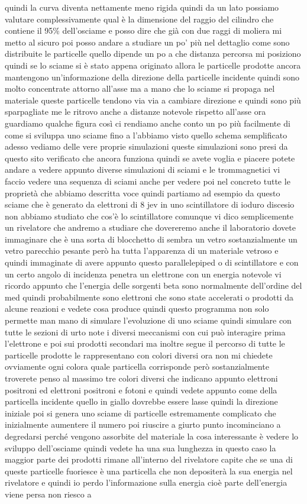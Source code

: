 {quindi la curva diventa nettamente meno rigida quindi da un lato possiamo valutare complessivamente qual è la dimensione del raggio del cilindro che contiene il 95\% dell'osciame e posso dire che già con due raggi di moliera mi metto al sicuro poi posso andare a studiare un po' più nel dettaglio come sono distribuite le particelle quello dipende un po a che distanza percorsa mi posiziono quindi se lo sciame si è stato appena originato allora le particelle prodotte ancora mantengono un'informazione della direzione della particelle incidente quindi sono molto concentrate attorno all'asse ma a mano che lo sciame si propaga nel materiale queste particelle tendono via via a cambiare direzione e quindi sono più sparpagliate me le ritrovo anche a distanze notevole rispetto all'asse ora guardiamo qualche figura così ci rendiamo anche conto un po più facilmente di come si sviluppa uno sciame fino a l'abbiamo visto quello schema semplificato adesso vediamo delle vere proprie simulazioni queste simulazioni sono presi da questo sito verificato che ancora funziona quindi se avete voglia e piacere potete andare a vedere appunto diverse simulazioni di sciami e le trommagnetici vi faccio vedere una sequenza di sciami anche per vedere poi nel concreto tutte le proprietà che abbiamo descritta voce quindi partiamo ad esempio da questo sciame che è generato da elettroni di 8 jev in uno scintillatore di ioduro discesio non abbiamo studiato che cos'è lo scintillatore comunque vi dico semplicemente un rivelatore che andremo a studiare che dovereremo anche il laboratorio dovete immaginare che è una sorta di blocchetto di sembra un vetro sostanzialmente un vetro parecchio pesante però ha tutta l'apparenza di un materiale vetroso e quindi immaginate di avere appunto questo parallelepiped o di scintillatore e con un certo angolo di incidenza penetra un elettrone con un energia notevole vi ricordo appunto che l'energia delle sorgenti beta sono normalmente dell'ordine del med quindi probabilmente sono elettroni che sono state accelerati o prodotti da alcune reazioni e vedete cosa produce quindi questo programma non solo permette man mano di simulare l'evoluzione di uno sciame quindi simulare con tutte le sezioni di urto note i diversi meccanismi con cui può interagire prima l'elettrone e poi sui prodotti secondari ma inoltre segue il percorso di tutte le particelle prodotte le rappresentano con colori diversi ora non mi chiedete ovviamente ogni colora quale particella corrisponde però sostanzialmente troverete penso al massimo tre colori diversi che indicano appunto elettroni positroni ed elettroni positroni e fotoni e quindi vedete appunto come della particella incidente quello in giallo dovrebbe essere lasse quindi la direzione iniziale poi si genera uno sciame di particelle estremamente complicato che inizialmente aumentere il numero poi riuscire a giurto punto incominciano a degredarsi perché vengono assorbite del materiale la cosa interessante è vedere lo sviluppo dell'osciame quindi vedete ha una sua lunghezza in questo caso la maggior parte dei prodotti rimane all'interno del rivelatore capite che se una di queste particelle fuoriesce è una particella che non depositerà la sua energia nel rivelatore e quindi io perdo l'informazione sulla energia cioè parte dell'energia viene persa non riesco a }
